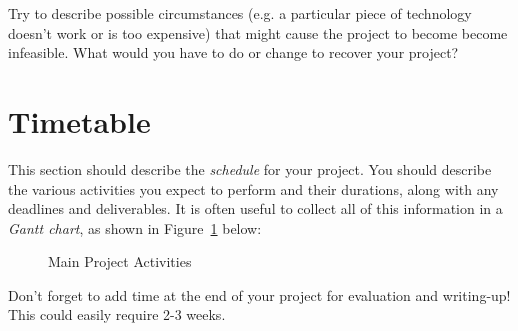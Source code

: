 \documentclass[a4paper,12pt]{article}
\begin{document}
Try to describe possible circumstances (e.g. a particular piece of
technology doesn't work or is too expensive) that might cause
the project to become become infeasible. What would you have to do
or change to recover your project?

\section*{Timetable}

This section should describe the {\em schedule} for your project. 
You should describe the various activities you expect to perform
and their durations, along with any deadlines and deliverables.
It is often useful to collect all of this information in a
{\em Gantt chart}, as shown in Figure~\ref{fig:plan} below:

\begin{figure}[htb]
\begin{center}
\caption{Main Project Activities\label{fig:plan}}
\end{center}
\end{figure}


Don't forget to add time at the end of your project for 
evaluation and writing-up! This could easily require 2-3 weeks.



\end{document}
